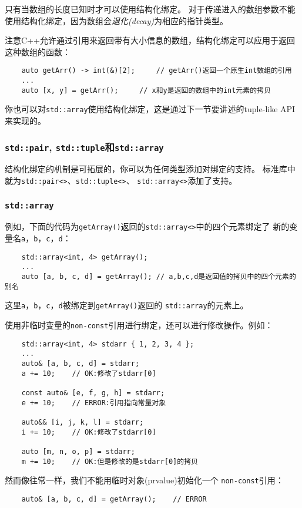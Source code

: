 只有当数组的长度已知时才可以使用结构化绑定。
对于传递进入的数组参数不能使用结构化绑定，因为数组会\emph{退化(decay)}为相应的指针类型。

注意C++允许通过引用来返回带有大小信息的数组，结构化绑定可以应用于返回这种数组的函数：
\begin{lstlisting}
    auto getArr() -> int(&)[2];     // getArr()返回一个原生int数组的引用
    ...
    auto [x, y] = getArr();     // x和y是返回的数组中的int元素的拷贝
\end{lstlisting}
你也可以对\texttt{std::array}使用结构化绑定，这是通过下一节要讲述的tuple-like API来实现的。

\subsubsection{\texttt{std::pair}, \texttt{std::tuple}和\texttt{std::array}}
结构化绑定的机制是可拓展的，你可以为任何类型添加对绑定的支持。
标准库中就为\texttt{std::pair<>}、\texttt{std::tuple<>}、
\texttt{std::array<>}添加了支持。

\subsubsection*{\texttt{std::array}}
例如，下面的代码为\texttt{getArray()}返回的\texttt{std::array<>}中的四个元素绑定了
新的变量名\texttt{a}，\texttt{b}，\texttt{c}，\texttt{d}：
\begin{lstlisting}
    std::array<int, 4> getArray();
    ...
    auto [a, b, c, d] = getArray(); // a,b,c,d是返回值的拷贝中的四个元素的别名
\end{lstlisting}
这里\texttt{a}，\texttt{b}，\texttt{c}，\texttt{d}被绑定到\texttt{getArray()}返回的
\texttt{std::array}的元素上。

使用非临时变量的\texttt{non-const}引用进行绑定，还可以进行修改操作。例如：
\begin{lstlisting}
    std::array<int, 4> stdarr { 1, 2, 3, 4 };
    ...
    auto& [a, b, c, d] = stdarr;
    a += 10;    // OK:修改了stdarr[0]

    const auto& [e, f, g, h] = stdarr;
    e += 10;    // ERROR:引用指向常量对象

    auto&& [i, j, k, l] = stdarr;
    i += 10;    // OK:修改了stdarr[0]

    auto [m, n, o, p] = stdarr;
    m += 10;    // OK:但是修改的是stdarr[0]的拷贝
\end{lstlisting}
然而像往常一样，我们不能用临时对象(prvalue)初始化一个 \texttt{non-const}引用：
\begin{lstlisting}
    auto& [a, b, c, d] = getArray();    // ERROR
\end{lstlisting}

